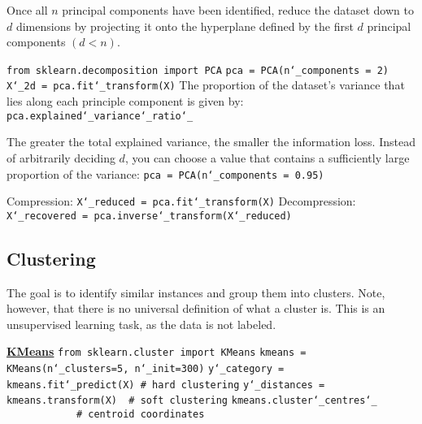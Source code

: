 \vspace{-3.0mm}
Once all $n$ principal components have been identified,
reduce the dataset down to $d$ dimensions
by projecting it onto the hyperplane defined by the first $d$ principal components $(d < n)$.

\texttt{from sklearn.decomposition import PCA}\newline
\texttt{pca = PCA(n\char`_components = 2)}\newline
\texttt{X\char`_2d = pca.fit\char`_transform(X)}\newline
The proportion of the dataset's variance that lies along each principle component is given by:\newline
\texttt{pca.explained\char`_variance\char`_ratio\char`_}

The greater the total explained variance,
the smaller the information loss.
Instead of arbitrarily deciding $d$,
you can choose a value that contains a sufficiently large proportion of the variance:\newline
\texttt{pca = PCA(n\char`_components = 0.95)}

Compression: \texttt{X\char`_reduced = pca.fit\char`_transform(X)}\newline
Decompression: \texttt{X\char`_recovered = pca.inverse\char`_transform(X\char`_reduced)}


\newpage
\subsection{Clustering}
The goal is to identify similar instances and group them into clusters.\newline
Note, however, that there is no universal definition of what a cluster is.\newline
This is an unsupervised learning task, as the data is not labeled.\newline

\underline{\textbf{KMeans}}\newline
\texttt{from sklearn.cluster import KMeans}\newline
\texttt{kmeans = KMeans(n\char`_clusters=5, n\char`_init=300)}\newline
\texttt{y\char`_category  = kmeans.fit\char`_predict(X) \# hard clustering}\newline
\texttt{y\char`_distances = kmeans.transform(X) ~\# soft clustering}\newline
\texttt{kmeans.cluster\char`_centres\char`_ ~~~~~~~~~~~~\# centroid coordinates}

